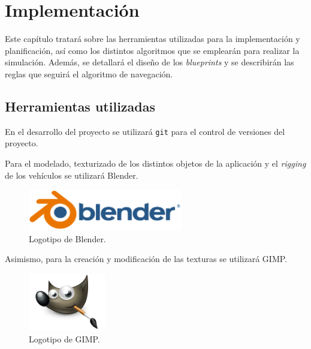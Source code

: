 \chapter{Implementación}

Este capítulo tratará sobre las herramientas utilizadas para la implementación y planificación, así como los distintos algoritmos que se emplearán para realizar la simulación. Además, se detallará el diseño de los \textit{blueprints} y se describirán las reglas que seguirá el algoritmo de navegación.

\section{Herramientas utilizadas}

En el desarrollo del proyecto se utilizará \verb|git| para el control de versiones del proyecto.

\bigskip

Para el modelado, texturizado de los distintos objetos de la aplicación y el \textit{rigging} de los vehículos se utilizará Blender\cite{blender}.

\begin{figure}[H]
    \centering
    \includegraphics[width=0.6\textwidth]{imagenes/blender-logo.png}
    \caption{Logotipo de Blender\cite{blender-logo}.}
    \label{fig:logoblender}
\end{figure}

Asimismo, para la creación y modificación de las texturas se utilizará GIMP\cite{gimp}.

\begin{figure}[H]
    \centering
    \includegraphics[width=0.3\textwidth]{imagenes/gimp-logo.png}
    \caption{Logotipo de GIMP\cite{gimp}.}
    \label{fig:logogimp}
\end{figure}

\bigskip

